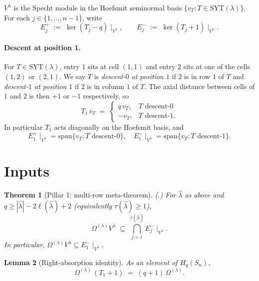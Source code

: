 \documentclass[11pt]{article}
\newtheorem{theorem}{Theorem}
\newtheorem{lemma}[theorem]{Lemma}
\theoremstyle{definition}
\newcommand{\Hq}{H_q}
\newcommand{\Sn}{S_n}
\newcommand{\Vlam}{V^{\lambda}}
\newcommand{\Om}{\Omega}
\newcommand{\hatl}{\widehat\lambda}
\newcommand{\elh}{\ell(\hatl)}
\newcommand{\SYT}{\mathrm{SYT}}
\begin{document}
$\Vlam$ is the Specht module in the Hoefsmit seminormal basis
$\{v_T : T \in \SYT(\lambda)\}$.  For each $j \in \{1, \ldots, n-1\}$,
write
\[
   E_j^+ \;:=\; \ker(T_j - q)\!\mid_{\Vlam},
   \qquad
   E_j^- \;:=\; \ker(T_j + 1)\!\mid_{\Vlam}.
\]

\paragraph{Descent at position 1.}
For $T \in \SYT(\lambda)$, entry $1$ sits at cell $(1,1)$ and entry
$2$ sits at one of the cells $(1,2)$ or $(2,1)$.  We say $T$ is
\emph{descent-$0$ at position $1$} if $2$ is in row $1$ of $T$ and
\emph{descent-$1$ at position $1$} if $2$ is in column $1$ of $T$.
The axial distance between cells of $1$ and $2$ is then $+1$ or $-1$
respectively, so
\begin{equation}\label{eq:T1-action}
   T_1\,v_T \;=\;
   \begin{cases}
      q\, v_T, & T \text{ descent-}0\\
      -v_T, & T \text{ descent-}1.
   \end{cases}
\end{equation}
In particular $T_1$ acts diagonally on the Hoefsmit basis, and
\begin{equation}\label{eq:eigenspace-decomp}
   E_1^+\!\mid_{\Vlam} = \mathrm{span}\{v_T : T \text{ descent-}0\},
   \quad
   E_1^-\!\mid_{\Vlam} = \mathrm{span}\{v_T : T \text{ descent-}1\}.
\end{equation}

\section{Inputs}\label{sec:inputs}

\begin{theorem}[Pillar 1: multi-row meta-theorem]\label{thm:pillar1}
\textnormal{(\cite[Theorem 1]{multirowMay15}.)}
For $\hatl$ as above and $q \ge |\hatl| - 2\elh + 2$ (equivalently
$\tau(\hatl) \ge 1$),
\[
   \Om^{(\lambda)} \Vlam \;\subseteq\; \bigcap_{j=1}^{\tau(\hatl)} E_j^-\!\mid_{\Vlam}.
\]
In particular, $\Om^{(\lambda)} \Vlam \subseteq E_1^-\!\mid_{\Vlam}$.
\end{theorem}

\begin{lemma}[Right-absorption identity]\label{lem:right-absorb}
As an element of $\Hq(\Sn)$,
\[
   \Om^{(\lambda)}\,(T_1 + 1) \;=\; (q+1)\,\Om^{(\lambda)}.
\]
\end{lemma}
\end{document}
